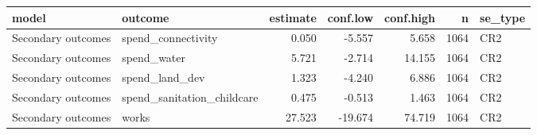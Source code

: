 
\begin{tabular}{llrrrrl}
\toprule
model & outcome & estimate & conf.low & conf.high & n & se\_type\\
\midrule
Secondary outcomes & spend\_connectivity & 0.050 & -5.557 & 5.658 & 1064 & CR2\\
Secondary outcomes & spend\_water & 5.721 & -2.714 & 14.155 & 1064 & CR2\\
Secondary outcomes & spend\_land\_dev & 1.323 & -4.240 & 6.886 & 1064 & CR2\\
Secondary outcomes & spend\_sanitation\_childcare & 0.475 & -0.513 & 1.463 & 1064 & CR2\\
Secondary outcomes & works & 27.523 & -19.674 & 74.719 & 1064 & CR2\\
\bottomrule
\end{tabular}
